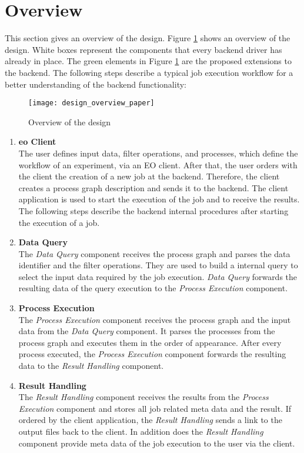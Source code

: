 \documentclass[draft,final]{vutinfth} %
\begin{document}
\section{Overview}\label{Design:Overview}
This section gives an overview of the design. Figure \ref{fig:overview} shows an overview of the design. White boxes represent the components that every backend driver has already in place. The green elements in Figure \ref{fig:overview} are the proposed extensions to the backend. The following steps describe a typical job execution workflow for a better understanding of the backend functionality:

\begin{figure}[h]
	\centering
	\texttt{[image: design\_overview\_paper]}
	\caption{Overview of the design}
	\label{fig:overview} 
\end{figure}


 \begin{enumerate}
	\item \textbf{\gls{eo} Client} \\
	The user defines input data, filter operations, and processes, which define the workflow of an experiment, via an EO client. After that, the user orders with the client the creation of a new job at the backend. Therefore, the client creates a process graph description and sends it to the backend. The client application is used to start the execution of the job and to receive the results. The following steps describe the backend internal procedures after starting the execution of a job.
	\item \textbf{Data Query} \\ 
	The \textit{Data Query} component receives the process graph and parses the data identifier and the filter operations. They are used to build a internal query to select the input data required by the job execution. \textit{Data Query} forwards the resulting data of the query execution to the \textit{Process Execution} component.
	\item \textbf{Process Execution} \\
	The \textit{Process Execution} component receives the process graph and the input data from the \textit{Data Query} component. It parses the processes from the process graph and executes them in the order of appearance. After every process executed, the \textit{Process Execution} component forwards the resulting data to the \textit{Result Handling} component.   
	\item \textbf{Result Handling} \\ 
	The \textit{Result Handling} component receives the results from the \textit{Process Execution} component and stores all job related meta data and the result. If ordered by the client application, the \textit{Result Handling} sends a link to the output files back to the client. In addition does the \textit{Result Handling} component provide meta data of the job execution to the user via the client. 
\end{enumerate}
\end{document}
